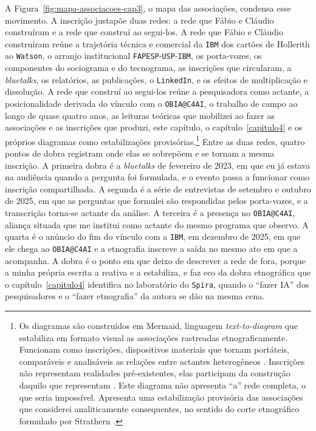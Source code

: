 A Figura~\ref{fig:mapa-associacoes-cap3}, o mapa das associações, condensa esse movimento. A inscrição justapõe duas redes: a rede que Fábio e Cláudio construíram e a rede que construí ao segui-los. A rede que Fábio e Cláudio construíram reúne a trajetória técnica e comercial da \texttt{IBM} dos cartões de Hollerith ao \texttt{Watson}, o arranjo institucional \texttt{FAPESP}-\texttt{USP}-\texttt{IBM}, os porta-vozes, os componentes do sociograma e do tecnograma, as inscrições que circularam, a \textit{bluetalks}, os relatórios, as publicações, o \texttt{LinkedIn}, e os efeitos de multiplicação e dissolução. A rede que construí ao segui-los reúne a pesquisadora como actante, a posicionalidade derivada do vínculo com o \texttt{OBIA@C4AI}, o trabalho de campo ao longo de quase quatro anos, as leituras teóricas que mobilizei ao fazer as associações e as inscrições que produzi, este capítulo, o capítulo~\ref{capitulo4} e os próprios diagramas como estabilizações provisórias.\footnote{Os diagramas são construídos em Mermaid, linguagem \textit{text-to-diagram} que estabiliza em formato visual as associações rastreadas etnograficamente. Funcionam como inscrições, dispositivos materiais que tornam portáteis, comparáveis e analisáveis as relações entre actantes heterogêneos \parencite{Latour2011CienciaEmAcao, Latour2017Esperanca}. Inscrições não representam realidades pré-existentes, elas participam da construção daquilo que representam \parencite{Law2004After}. Este diagrama não apresenta \enquote{a} rede completa, o que seria impossível. Apresenta uma estabilização provisória das associações que considerei analiticamente consequentes, no sentido do corte etnográfico formulado por Strathern \parencite{strathern2011cortando}.} Entre as duas redes, quatro pontos de dobra registram onde elas se sobrepõem e se tornam a mesma inscrição. A primeira dobra é a \textit{bluetalks} de fevereiro de 2023, em que eu já estava na audiência quando a pergunta foi formulada, e o evento passa a funcionar como inscrição compartilhada. A segunda é a série de entrevistas de setembro e outubro de 2025, em que as perguntas que formulei são respondidas pelos porta-vozes, e a transcrição torna-se actante da análise. A terceira é a presença no \texttt{OBIA@C4AI}, aliança situada que me institui como actante do mesmo programa que observo. A quarta é o anúncio do fim do vínculo com a \texttt{IBM}, em dezembro de 2025, em que ele chega ao \texttt{OBIA@C4AI} e a etnografia inscreve a saída no mesmo ato em que a acompanha. A dobra é o ponto em que deixo de descrever a rede de fora, porque a minha própria escrita a reativa e a estabiliza, e faz eco da dobra etnográfica que o capítulo~\ref{capitulo4} identifica no laboratório do \texttt{Spira}, quando o \enquote{fazer IA} dos pesquisadores e o \enquote{fazer etnografia} da autora se dão na mesma cena.

